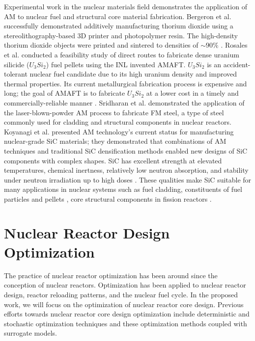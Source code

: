 Experimental work in the nuclear materials field demonstrates the application 
of \gls{AM} to nuclear fuel and structural core material fabrication. 
Bergeron et al. \cite{bergeron_early_2018} successfully demonstrated additively 
manufacturing thorium dioxide using a stereolithography-based 3D printer 
and photopolymer resin. 
The high-density thorium dioxide objects were printed and sintered to densities 
of $\sim90\%$ \cite{bergeron_early_2018}. 
Rosales et al. \cite{rosales_characterizing_2019} conducted a feasibility study 
of direct routes to fabricate dense uranium silicide ($U_3Si_2$) fuel pellets 
using the \gls{INL} invented \gls{AMAFT}. 
$U_3Si_2$ is an accident-tolerant nuclear fuel candidate due to its
high uranium density and improved thermal properties. 
Its current metallurgical fabrication process is expensive and long; the goal of
\gls{AMAFT} is to fabricate $U_3Si_2$ at a lower cost in a timely and
commercially-reliable manner \cite{rosales_characterizing_2019}.  
Sridharan et al. \cite{sridharan_performance_2019} demonstrated the application of
the laser-blown-powder \gls{AM} process to fabricate \gls{FM} steel, a type of 
steel commonly used for cladding and structural components in nuclear reactors. 
Koyanagi et al. \cite{koyanagi_additive_2020} presented \gls{AM} technology's 
current status for manufacturing nuclear-grade \gls{SiC} materials; they 
demonstrated that combinations of \gls{AM} techniques and traditional \gls{SiC} 
densification methods enabled new designs of \gls{SiC} components with complex shapes. 
\gls{SiC} has excellent strength at elevated temperatures, chemical inertness, 
relatively low neutron absorption, and stability under neutron irradiation up 
to high doses \cite{sauder_ceramic_2014, snead_handbook_2007,koyanagi_additive_2020}. 
These qualities make \gls{SiC} suitable for many applications in nuclear systems 
such as fuel cladding, constituents of fuel particles \cite{snead_handbook_2007} 
and pellets \cite{terrani_progress_2015}, core structural components in fission 
reactors \cite{sauder_ceramic_2014}. 

\section{Nuclear Reactor Design Optimization}
\label{sec:opt}
The practice of nuclear reactor optimization has been around since the conception of 
nuclear reactors. 
Optimization has been applied to nuclear reactor design, reactor reloading 
patterns, and the nuclear fuel cycle.  
In the proposed work, we will focus on the optimization of nuclear reactor 
core design. 
Previous efforts towards nuclear reactor core design optimization include
deterministic and stochastic optimization techniques and these optimization 
methods coupled with surrogate models. 

